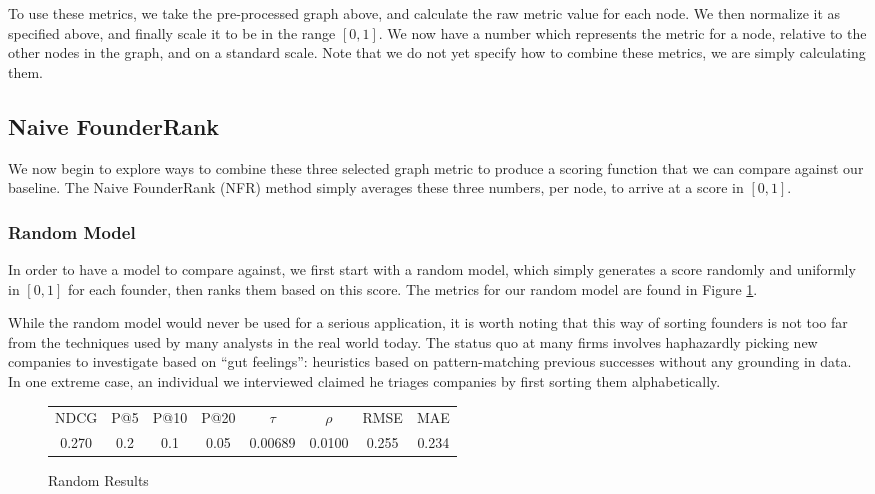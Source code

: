 To use these metrics, we take the pre-processed graph above, and calculate the raw metric value for each node. We then normalize it as specified above, and finally scale it to be in the range $[0, 1]$. We now have a number which represents the metric for a node, relative to the other nodes in the graph, and on a standard scale. Note that we do not yet specify how to combine these metrics, we are simply calculating them.

\subsection{Naive FounderRank}

We now begin to explore ways to combine these three selected graph metric to produce a scoring function that we can compare against our baseline. The Naive FounderRank (NFR) method simply averages these three numbers, per node, to arrive at a score in $[0, 1]$.

\subsubsection{Random Model}

In order to have a model to compare against, we first start with a random model, which simply generates a score randomly and uniformly in $[0, 1]$ for each founder, then ranks them based on this score. The metrics for our random model are found in Figure \ref{fig:rand:results}.

While the random model would never be used for a serious application, it is worth noting that this way of sorting founders is not too far from the techniques used by many analysts in the real world today. The status quo at many firms involves haphazardly picking new companies to investigate based on ``gut feelings'': heuristics based on pattern-matching previous successes without any grounding in data. In one extreme case, an individual we interviewed claimed he triages companies by first sorting them alphabetically.

\begin{figure}[ht]
\begin{tabular}{c | c | c | c | c | c | c | c}
NDCG & P@5 & P@10 & P@20 & $\tau$ & $\rho$ & RMSE & MAE  \\
0.270 & 0.2 & 0.1 & 0.05 & 0.00689 & 0.0100 & 0.255 & 0.234 \\
\end{tabular}
\centering
\caption{Random Results}
\label{fig:rand:results}
\end{figure}

